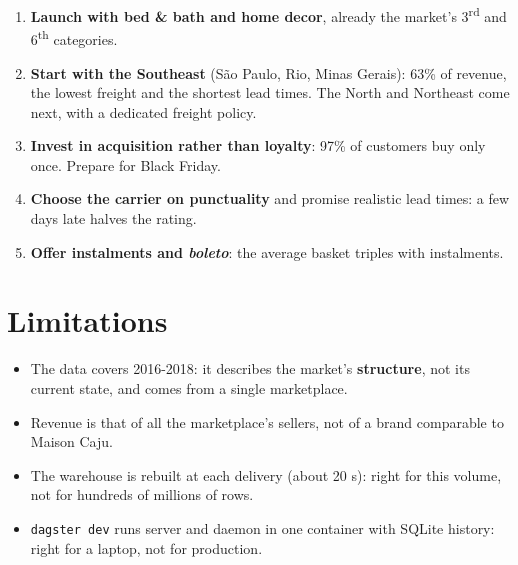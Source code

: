 \documentclass[11pt, a4paper, oneside, headings=normal, numbers=noenddot, DIV=12]{scrartcl}
\begin{document}
\begin{keybox}
\begin{enumerate}[leftmargin=1.4em]
  \item \textbf{Launch with bed \& bath and home decor}, already the market's 3\textsuperscript{rd} and 6\textsuperscript{th} categories.
  \item \textbf{Start with the Southeast} (São Paulo, Rio, Minas Gerais): 63\% of revenue, the lowest freight and the shortest lead times.
        The North and Northeast come next, with a dedicated freight policy.
  \item \textbf{Invest in acquisition rather than loyalty}: 97\% of customers buy only once. Prepare for Black Friday.
  \item \textbf{Choose the carrier on punctuality} and promise realistic lead times: a few days late halves the rating.
  \item \textbf{Offer instalments and \emph{boleto}}: the average basket triples with instalments.
\end{enumerate}
\end{keybox}

\section{Limitations}
\begin{itemize}[leftmargin=1.2em]
  \item The data covers 2016-2018: it describes the market's \textbf{structure}, not its current state, and comes from a single marketplace.
  \item Revenue is that of all the marketplace's sellers, not of a brand comparable to Maison Caju.
  \item The warehouse is rebuilt at each delivery (about 20 s): right for this volume, not for hundreds of millions of rows.
  \item \texttt{dagster dev} runs server and daemon in one container with SQLite history: right for a laptop, not for production.
\end{itemize}

\end{document}
